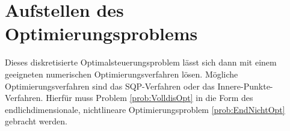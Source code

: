 %












\section{Aufstellen des Optimierungsproblems}
Dieses diskretisierte Optimalsteuerungsproblem lässt sich dann mit einem geeigneten numerischen Optimierungsverfahren lösen. Mögliche Optimierungsverfahren sind das SQP-Verfahren oder das Innere-Punkte-Verfahren. Hierfür muss Problem \ref{prob:VolldisOpt} in die Form des endlichdimensionale, nichtlineare Optimierungsproblem \ref{prob:EndNichtOpt} gebracht werden.

